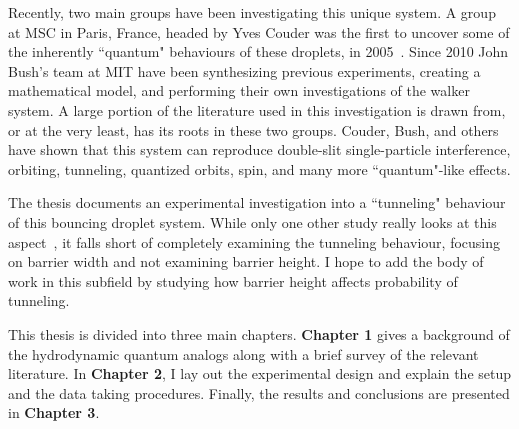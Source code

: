 	Recently, two main groups have been investigating this unique system. A group at MSC in Paris, France, headed by Yves Couder was the first to uncover some of the inherently ``quantum" behaviours of these droplets, in 2005~\cite{Couder2005b}. Since 2010 John Bush's team at MIT have been synthesizing previous experiments, creating a mathematical model, and performing their own investigations of the walker system. A large portion of the literature used in this investigation is drawn from, or at the very least, has its roots in these two groups. Couder, Bush, and others have shown that this system can reproduce double-slit single-particle interference, orbiting, tunneling, quantized orbits, spin, and many more ``quantum"-like effects.
		
	The thesis documents an experimental investigation into a ``tunneling" behaviour of this bouncing droplet system. While only one other study really looks at this aspect~\cite{tunneling}, it falls short of completely examining the tunneling behaviour, focusing on barrier width and not examining barrier height. I hope to add the body of work in this subfield by studying how barrier height affects probability of tunneling.   
	
	This thesis is divided into three main chapters. \textbf{Chapter 1} gives a background of the hydrodynamic quantum analogs along with a brief survey of the relevant literature. In \textbf{Chapter 2}, I lay out the experimental design and explain the setup and the data taking procedures. Finally, the results and conclusions are presented in \textbf{Chapter 3}.	    